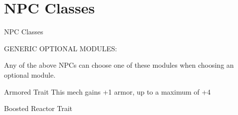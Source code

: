 \chapter{NPC Classes}

        NPC Classes






















































                                     GENERIC OPTIONAL MODULES:

Any of the above NPCs can choose one of these modules when choosing an optional module.


Armored
Trait
This mech gains +1 armor, up to a maximum of +4


Boosted Reactor
Trait

